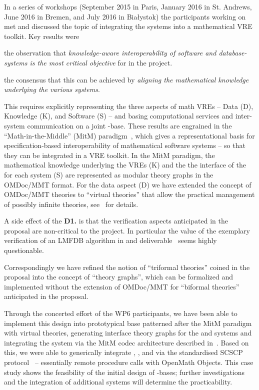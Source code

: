 \documentclass{deliverablereport}
\begin{document}
In a series of workshops (September 2015 in Paris, January 2016 in
St. Andrews, June 2016 in Bremen, and July 2016 in Bia{\l}ystok) the
participants working on  met and discussed the topic
of integrating the \pn systems into a mathematical VRE toolkit.  Key
results were
\begin{compactitem}[\bf D1.]
\item the observation that \emph{knowledge-aware interoperability of
    software and database-systems is the most critical objective} for
   in the \pn project.
\item the consensus that this can be achieved by \emph{aligning the
    mathematical knowledge underlying the various systems}.
\end{compactitem}
This requires explicitly representing the three aspects of math VREs
-- Data (D), Knowledge (K), and Software (S) -- and basing
computational services and inter-system communication on a joint
\DKS-base. These results are engrained in the ``Math-in-the-Middle''
(MitM) paradigm~\cite{DehKohKon:iop16}, which gives a representational
basis for specification-based interoperability of mathematical
software systems -- so that they can be integrated in a VRE
toolkit. In the MitM paradigm, the mathematical knowledge underlying
the VREs (K) and the the interface of the for each system (S) are
represented as modular theory graphs in the OMDoc/MMT format. For the
data aspect (D) we have extended the concept of OMDoc/MMT theories to
``virtual theories'' that allow the practical management of possibly
infinite theories, see~\cite{ODK-D6.2} for details.

A side effect of the \textbf{D1.} is that the verification aspects
anticipated in the proposal are non-critical to the \pn project. In
particular the value of the exemplary verification of an LMFDB
algorithm in  and
deliverable~ seems highly questionable.

Correspondingly we have refined the notion of ``triformal theories''
coined in the proposal into the concept of ``\DKS theory graphs'',
which can be formalized and implemented without the extension of
OMDoc/MMT for ``biformal theories'' anticipated in the proposal.

Through the concerted effort of the WP6 participants, we have been
able to implement this design into prototypical \DKS base patterned
after the MitM paradigm with virtual theories, generating interface
theory graphs for the \GAP and \Sage systems and integrating the
\LMFDB system via the MitM codec architecture described
in~\cite{ODK-D6.2}. Based on this, we were able to generically
integrate \GAP, \Sage, and \LMFDB via the standardised SCSCP
protocol~\cite{HorRoz:ossp09} -- essentially remote procedure calls
with OpenMath Objects. This case study shows the feasibility of the
initial design of \DKS-bases; further investigations and the
integration of additional systems will determine the practicability.
\end{document}
